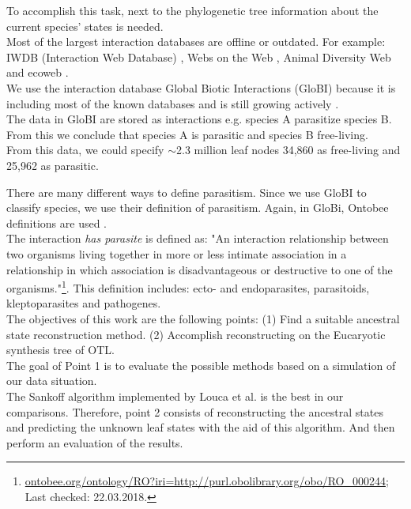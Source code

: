   To accomplish this task, next to the phylogenetic tree information about the current species' 
    states is needed. \\
  Most of the largest interaction databases are offline or outdated. For example: IWDB (Interaction 
    Web Database) \cite{IWDB2003}, Webs on the Web \cite{WOW2004}, Animal Diversity Web 
    \cite{Myers2003} and ecoweb \cite{Cohen2010}. \\
  We use the interaction database Global Biotic Interactions (GloBI) \cite{Poelen2014} because it is 
    including most of the known databases and is still growing actively \cite{Poelen2014}. \\
  The data in GloBI are stored as interactions e.g.  species A parasitize species B. From this we 
    conclude that species A is parasitic and species B free-living. \\
  From this data, we could specify $\sim$2.3 million leaf nodes 34,860 as free-living and 25,962 
    as parasitic. 

  There are many different ways to define parasitism. Since we use GloBI to classify species, we use 
    their definition of parasitism. Again, in GloBi, Ontobee definitions are used \cite{Xiang2011}. \\
  The interaction \textit{has parasite} is defined as: "An interaction relationship between two 
    organisms living together in more or less intimate association in a relationship in which 
    association is disadvantageous or destructive to one of the organisms."\footnote{
      \hyperlink{http://www.ontobee.org/ontology/RO?iri=http://purl.obolibrary.org/obo/RO_0002445}
      {ontobee.org/ontology/RO?iri=http://purl.obolibrary.org/obo/RO\_000244}; Last checked: 22.03.2018.
    }. This definition includes: ecto- and endoparasites, parasitoids, kleptoparasites and pathogenes. \\

  The objectives of this work are the following points: (1) Find a suitable ancestral state 
    reconstruction method. (2) Accomplish reconstructing on the Eucaryotic synthesis tree of OTL. \\
  The goal of Point 1 is to evaluate the possible methods based on a simulation of our data 
    situation. \\
  The Sankoff algorithm implemented by Louca et al. is the best in our comparisons. Therefore, 
    point 2 consists of reconstructing the ancestral states and predicting the unknown leaf states 
    with the aid of this algorithm. And then perform an evaluation of the results. \\

